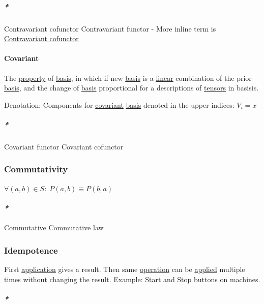 \documentclass[a4paper,14pt,oneside]{book}
\begin{document}
\subparagraph{\emph{*}}
\label{sec:org7b32a13}

\label{org4211c9d}Contravariant cofunctor
\label{org25d96a0}Contravariant functor - More inline term is \hyperref[org4211c9d]{Contravariant cofunctor}

\paragraph{\label{org07465dc}Covariant}
\label{sec:orga5c0ae5}
The \hyperref[org81d0df4]{property} of \hyperref[org6496c33]{basis}, in which if new \hyperref[org6496c33]{basis} is a \hyperref[org5ebe552]{linear} combination of the prior \hyperref[org6496c33]{basis}, and the change of \hyperref[org6496c33]{basis} proportional for a descriptions of \hyperref[org08ef2f2]{tensors} in basisis.

Denotation:
Components for \hyperref[org07465dc]{covariant} \hyperref[org6496c33]{basis} denoted in the upper indices:
\(V_{i} = x\)

\subparagraph{\emph{*}}
\label{sec:org6b626c6}

\label{org6c2a972}Covariant functor
\label{org629d987}Covariant cofunctor

\subsubsection{\label{org4500176}Commutativity}
\label{sec:orgb3ee4a8}
\(\forall (a,b) \in S : \; P(a,b) \equiv P(b,a)\)

\paragraph{\emph{*}}
\label{sec:org77e659a}

\label{org5aa111e}Commutative
\label{org31ed84a}Commutative law

\subsubsection{\label{org090650c}Idempotence}
\label{sec:orgcb8a08f}
First \hyperref[orgb96b365]{application} gives a result. Then same \hyperref[orgf96349c]{operation} can be \hyperref[org4970229]{applied} multiple times without changing the result.
Example: Start and Stop buttons on machines.

\paragraph{\emph{*}}
\label{sec:orge66ad89}
\end{document}
